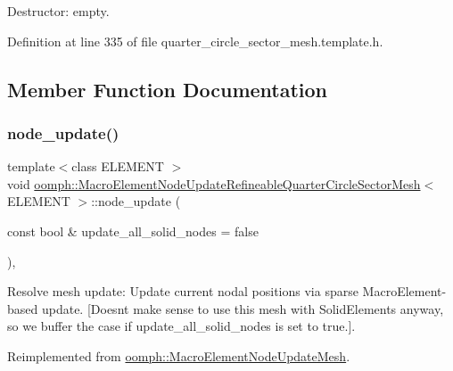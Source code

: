 Destructor\+: empty. 



Definition at line 335 of file quarter\+\_\+circle\+\_\+sector\+\_\+mesh.\+template.\+h.



\subsection{Member Function Documentation}
\mbox{\label{classoomph_1_1MacroElementNodeUpdateRefineableQuarterCircleSectorMesh_a99403c711c3fdc2a601b478deebef9fe}} 
\subsubsection{\texorpdfstring{node\+\_\+update()}{node\_update()}}
{\footnotesize\ttfamily template$<$class E\+L\+E\+M\+E\+NT $>$ \\
void \hyperlink{classoomph_1_1MacroElementNodeUpdateRefineableQuarterCircleSectorMesh}{oomph\+::\+Macro\+Element\+Node\+Update\+Refineable\+Quarter\+Circle\+Sector\+Mesh}$<$ E\+L\+E\+M\+E\+NT $>$\+::node\+\_\+update (\begin{DoxyParamCaption}\item[{const bool \&}]{update\+\_\+all\+\_\+solid\+\_\+nodes = {\ttfamily false} }\end{DoxyParamCaption})\hspace{0.3cm}{\ttfamily [inline]}, {\ttfamily [virtual]}}



Resolve mesh update\+: Update current nodal positions via sparse Macro\+Element-\/based update. \mbox{[}Doesn\textquotesingle{}t make sense to use this mesh with Solid\+Elements anyway, so we buffer the case if update\+\_\+all\+\_\+solid\+\_\+nodes is set to true.\mbox{]}. 



Reimplemented from \hyperlink{classoomph_1_1MacroElementNodeUpdateMesh_ab5271c4514bcd236271307361423ac9d}{oomph\+::\+Macro\+Element\+Node\+Update\+Mesh}.



